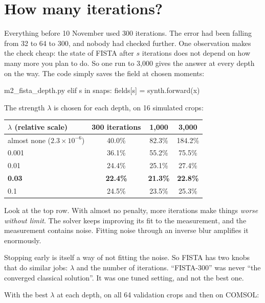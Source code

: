 \section{How many iterations?}

Everything before 10 November used 300 iterations. The error had been falling from 32 to 64 to 300, and nobody had
checked further. One observation makes the check cheap: the state of FISTA after $s$ iterations does not depend on how
many more you plan to do. So one run to 3{,}000 gives the answer at every depth on the way. The code simply saves the
field at chosen moments:

\begin{code*}{m2_fista_depth.py}
            elif s in snaps:
                fields[s] = synth.forward(x)
\end{code*}

The strength $\lambda$ is chosen for each depth, on 16 simulated crops:

\begin{center}
\begin{tabular}{lccc}
\toprule
$\lambda$ (relative scale) & 300 iterations & 1{,}000 & 3{,}000 \\
\midrule
almost none ($2.3\times10^{-6}$) & 40.0\% & 82.3\% & 184.2\% \\
0.001 & 36.1\% & 55.2\% & 75.5\% \\
0.01 & 24.4\% & 25.1\% & 27.4\% \\
\textbf{0.03} & \textbf{22.4\%} & \textbf{21.3\%} & \textbf{22.8\%} \\
0.1 & 24.5\% & 23.5\% & 25.3\% \\
\bottomrule
\end{tabular}
\end{center}

Look at the top row. With almost no penalty, more iterations make things \emph{worse without limit}. The solver keeps
improving its fit to the measurement, and the measurement contains noise. Fitting noise through an inverse blur
amplifies it enormously.

\begin{keyidea}
Stopping early is itself a way of not fitting the noise. So FISTA has two knobs that do similar jobs: $\lambda$ and the
number of iterations. ``FISTA-300'' was never ``the converged classical solution''. It was one tuned setting, and
not the best one.
\end{keyidea}

With the best $\lambda$ at each depth, on all 64 validation crops and then on COMSOL:

